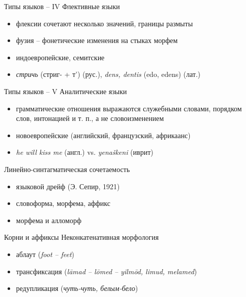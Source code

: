 \documentclass{beamer}
\begin{document}
\begin{frame}{Типы языков -- IV}
Флективные языки\\
\medskip
\begin{itemize}
\item флексии сочетают несколько значений, границы размыты
\item фузия -- фонетические изменения на стыках морфем
\item индоевропейские, семитские
\item \textit{стричь} (стриг- + т') (рус.), \textit{dens, dentis} (edo, edens) (лат.)
\end{itemize}
\end{frame}

\begin{frame}{Типы языков -- V}
Аналитические языки\\
\medskip
\begin{itemize}
\item грамматические отношения выражаются служебными словами, порядком слов, интонацией и т. п., а не словоизменением
\item новоевропейские (английский, французский, африкаанс)
\item \textit{he will kiss me} (англ.) vs. \textit{yena\v{s}keni} (иврит)
\end{itemize}
\end{frame}

\begin{frame}{Линейно-синтагматическая сочетаемость}
\begin{itemize}
\item языковой дрейф (Э. Сепир, 1921)
\item словоформа, морфема, аффикс
\item морфема и алломорф
\end{itemize}
\end{frame}

\begin{frame}{Корни и аффиксы}
Неконкатенативная морфология\\
\medskip
\begin{itemize}
\item аблаут (\textit{foot -- feet})
\item трансфиксация (\textit{l\={a}mad -- l\={o}med -- yilm\={o}d, limud, melamed})
\item редупликация (\textit{чуть-чуть, белым-бело})
\end{itemize}
\end{frame}
\end{document}
